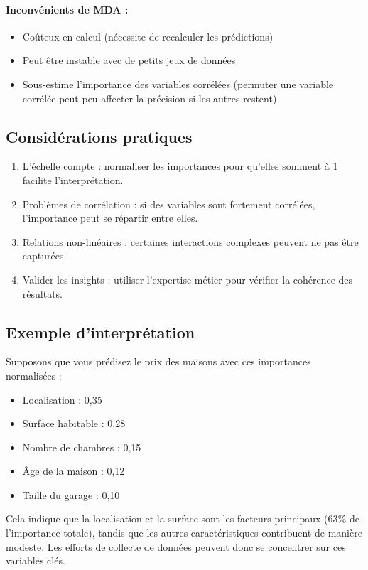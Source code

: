 \paragraph{Inconvénients de MDA :}
\begin{itemize}
    \item Coûteux en calcul (nécessite de recalculer les prédictions)
    \item Peut être instable avec de petits jeux de données
    \item Sous-estime l’importance des variables corrélées (permuter une variable corrélée peut peu affecter la précision si les autres restent)
\end{itemize}

\subsection{Considérations pratiques}

\begin{enumerate}
    \item L’échelle compte : normaliser les importances pour qu’elles somment à 1 facilite l’interprétation.
    \item Problèmes de corrélation : si des variables sont fortement corrélées, l’importance peut se répartir entre elles.
    \item Relations non-linéaires : certaines interactions complexes peuvent ne pas être capturées.
    \item Valider les insights : utiliser l’expertise métier pour vérifier la cohérence des résultats.
\end{enumerate}

\subsection{Exemple d’interprétation}

Supposons que vous prédisez le prix des maisons avec ces importances normalisées :
\begin{itemize}
    \item Localisation : 0,35
    \item Surface habitable : 0,28
    \item Nombre de chambres : 0,15
    \item Âge de la maison : 0,12
    \item Taille du garage : 0,10
\end{itemize}

Cela indique que la localisation et la surface sont les facteurs principaux (63\% de l’importance totale), tandis que les autres caractéristiques contribuent de manière modeste. Les efforts de collecte de données peuvent donc se concentrer sur ces variables clés.

